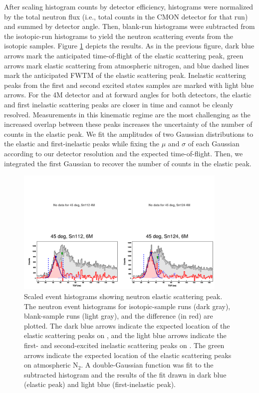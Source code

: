 After scaling histogram counts by detector efficiency, histograms were
normalized by the total neutron flux
(i.e., total counts in the CMON detector for that run) and summed by detector
angle. Then, blank-run histograms
were subtracted from the isotopic-run histograms to yield the neutron scattering
events from the isotopic samples. Figure \ref{tiledAngleData} depicts the
results. As in the previous figure, dark blue arrows mark the anticipated
time-of-flight of the elastic scattering peak, green arrows mark elastic
scattering from atmospheric nitrogen, and blue dashed lines mark the anticipated
FWTM of the elastic scattering peak. Inelastic scattering peaks from the first and
second excited states samples are marked with light blue
arrows. For the 4M detector and at forward angles for both detectors, the elastic and first 
inelastic scattering peaks are closer in time and cannot be cleanly resolved. Measurements in this
kinematic regime are the most challenging as the increased overlap between
these peaks increases the uncertainty of the number of counts in the elastic
peak. We fit the amplitudes of two Gaussian distributions to the elastic and
first-inelastic peaks while fixing
the $\mu$ and $\sigma$ of each Gaussian according to our detector resolution and
the expected time-of-flight. Then, we integrated the first Gaussian to recover the
number of counts in the elastic peak.

\begin{figure}[ht]
    \centering
    \includegraphics[width = 0.9\textwidth]{figures/tiledAngleData.png}
    \caption[Scaled event histograms showing neutron elastic scattering peak]
    {
        Scaled event histograms showing neutron elastic scattering peak. The
        neutron event histograms for isotopic-sample runs (dark gray),
        blank-sample runs (light gray), and the difference (in red) are plotted.
        The dark blue arrows indicate the expected location of the elastic scattering
        peaks on \snTwelveFour, and the light blue arrows indicate the first-
        and second-excited inelastic scattering peaks on \snTwelveFour. The
        green arrows indicate the expected location of the elastic scattering
        peaks on atmospheric N$_{2}$. A double-Gaussian function was fit to the
        subtracted histogram and the results of the fit drawn in dark
        blue (elastic peak) and light blue (first-inelastic peak).
    }
        \label{tiledAngleData}
\end{figure}

